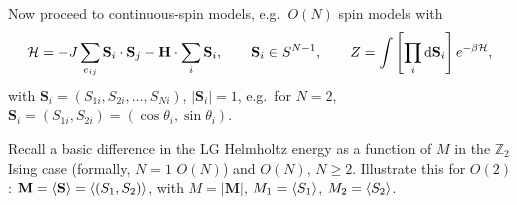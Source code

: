 Now proceed to continuous-spin models, e.g.\ $O(N)$ spin models with
\begin{equation}
  \mathcal{H} = -J\sum_{e_{ij}}\mathbf{S}_i\cdot\mathbf{S}_j - \mathbf{H}\cdot\sum_i\mathbf{S}_i,\qquad
  \mathbf{S}_i\in S^{N-1},\qquad
  Z = \int\left[\prod_i\mathop{}\!\mathrm{d}\mathbf{S}_i\right]e^{-\beta\mathcal{H}},
\end{equation}
with $\mathbf{S}_i = (S_{1i},S_{2i},\ldots,S_{Ni})$, $|\mathbf{S}_i| = 1$, e.g.\ for $N = 2$,
$\mathbf{S}_i = (S_{1i},S_{2i}) = (\cos\theta_i,\sin\theta_i)$.

Recall a basic difference in the LG Helmholtz energy as a function of $M$ in the $\mathbb{Z}_2$ Ising
case (formally, $N = 1$ $O(N)$) and $O(N)$, $N\ge 2$. Illustrate this for $O(2)$:
$\mathbf{M} = \langle \mathbf{S}\rangle = \langle (S_1,S_2)\rangle$, with $M = |\mathbf{M}|$, $M_1 = \langle S_1\rangle$,
$M_2 = \langle S_2\rangle$.

